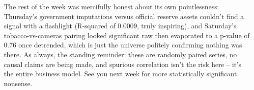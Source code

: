 The rest of the week was mercifully honest about its own pointlessness: Thursday's government imputations versus official reserve assets couldn't find a signal with a flashlight (R-squared of 0.0009, truly inspiring), and Saturday's tobacco-vs-cameras pairing looked significant raw then evaporated to a p-value of 0.76 once detrended, which is just the universe politely confirming nothing was there. As always, the standing reminder: these are randomly paired series, no causal claims are being made, and spurious correlation isn't the risk here -- it's the entire business model. See you next week for more statistically significant nonsense.
